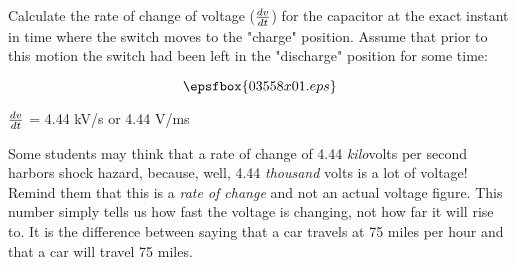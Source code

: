 

Calculate the rate of change of voltage ($dv \over dt$) for the capacitor at the exact instant in time where the switch moves to the "charge" position.  Assume that prior to this motion the switch had been left in the "discharge" position for some time:

$$\epsfbox{03558x01.eps}$$







$dv \over dt$ = 4.44 kV/s or 4.44 V/ms







Some students may think that a rate of change of 4.44 {\it kilo}volts per second harbors shock hazard, because, well, 4.44 {\it thousand} volts is a lot of voltage!  Remind them that this is a {\it rate of change} and not an actual voltage figure.  This number simply tells us how fast the voltage is changing, not how far it will rise to.  It is the difference between saying that a car travels at 75 miles per hour and that a car will travel 75 miles.




